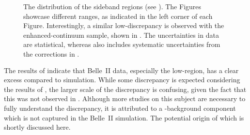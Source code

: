 \begin{figure}[htbp!]
    \centering
    \caption{\label{fig:sidebands_mbc} 
    The \Mbc distribution of the \EB sideband regions (see ).
    The Figures showcase different \EB ranges, as indicated in the left corner of each Figure.
    Interestingly, a similar low-\Mbc discrepancy is observed with the enhanced-continuum sample, shown in .
    The uncertainties in data are statistical, whereas \MC also includes systematic uncertainties from the corrections in .
    }
\end{figure}

The results of  indicate that Belle~II data, especially the low-\Mbc region, has a clear excess compared to simulation.
While some discrepancy is expected considering the results of ,
the larger scale of the discrepancy is confusing, given the fact that this was not observed in .
Although more studies on this subject are necessary to fully understand the discrepancy, 
it is attributed to a \BB-background component which is not captured in the Belle~II simulation. 
The potential origin of which is shortly discussed here.

